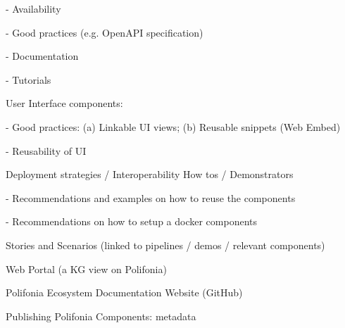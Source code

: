- Availability 

- Good practices (e.g. OpenAPI specification) 

- Documentation 

- Tutorials

User Interface components:

- Good practices: (a) Linkable UI views; (b) Reusable snippets (Web Embed) 

- Reusability of UI 

Deployment strategies / Interoperability How tos / Demonstrators 

- Recommendations and examples on how to reuse the components 

- Recommendations on how to setup a docker components 

Stories and Scenarios (linked to pipelines / demos / relevant components) 

Web Portal (a KG view on Polifonia) 

Polifonia Ecosystem Documentation Website (GitHub) 

Publishing Polifonia Components: metadata